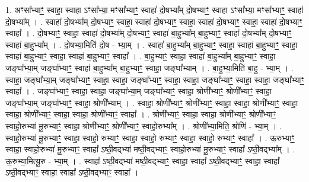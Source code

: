 \documentclass[17pt]{extarticle}
\begin{document}
1. अꣳसा᳚भ्याꣳ॒॒ स्वाहा॒ स्वाहा ऽꣳसा᳚भ्या॒ मꣳसा᳚भ्याꣳ॒॒ स्वाहा॑ दो॒षभ्या᳚म् दो॒षभ्याꣳ॒॒ स्वाहा ऽꣳसा᳚भ्या॒ मꣳसा᳚भ्याꣳ॒॒ स्वाहा॑ दो॒षभ्या᳚म् । . स्वाहा॑ दो॒षभ्या᳚म् दो॒षभ्याꣳ॒॒ स्वाहा॒ स्वाहा॑ दो॒षभ्याꣳ॒॒ स्वाहा॒ स्वाहा॑ दो॒षभ्याꣳ॒॒ स्वाहा॒ स्वाहा॑ दो॒षभ्याꣳ॒॒ स्वाहा᳚ । . दो॒षभ्याꣳ॒॒ स्वाहा॒ स्वाहा॑ दो॒षभ्या᳚म् दो॒षभ्याꣳ॒॒ स्वाहा॑ बा॒हुभ्या᳚म् बा॒हुभ्याꣳ॒॒ स्वाहा॑ दो॒षभ्या᳚म् दो॒षभ्याꣳ॒॒ स्वाहा॑ बा॒हुभ्या᳚म् । . दो॒षभ्या॒मिति॑ दो॒ष - भ्या॒म् । . स्वाहा॑ बा॒हुभ्या᳚म् बा॒हुभ्याꣳ॒॒ स्वाहा॒ स्वाहा॑ बा॒हुभ्याꣳ॒॒ स्वाहा॒ स्वाहा॑ बा॒हुभ्याꣳ॒॒ स्वाहा॒ स्वाहा॑ बा॒हुभ्याꣳ॒॒ स्वाहा᳚ । . बा॒हुभ्याꣳ॒॒ स्वाहा॒ स्वाहा॑ बा॒हुभ्या᳚म् बा॒हुभ्याꣳ॒॒ स्वाहा॒ जङ्घा᳚भ्या॒म् जङ्घा᳚भ्याꣳ॒॒ स्वाहा॑ बा॒हुभ्या᳚म् बा॒हुभ्याꣳ॒॒ स्वाहा॒ जङ्घा᳚भ्याम् । . बा॒हुभ्या॒मिति॑ बा॒हु - भ्या॒म् । . स्वाहा॒ जङ्घा᳚भ्या॒म् जङ्घा᳚भ्याꣳ॒॒ स्वाहा॒ स्वाहा॒ जङ्घा᳚भ्याꣳ॒॒ स्वाहा॒ स्वाहा॒ जङ्घा᳚भ्याꣳ॒॒ स्वाहा॒ स्वाहा॒ जङ्घा᳚भ्याꣳ॒॒ स्वाहा᳚ । . जङ्घा᳚भ्याꣳ॒॒ स्वाहा॒ स्वाहा॒ जङ्घा᳚भ्या॒म् जङ्घा᳚भ्याꣳ॒॒ स्वाहा॒ श्रोणी᳚भ्याꣳ॒॒ श्रोणी᳚भ्याꣳ॒॒ स्वाहा॒ जङ्घा᳚भ्या॒म् जङ्घा᳚भ्याꣳ॒॒ स्वाहा॒ श्रोणी᳚भ्याम् । . स्वाहा॒ श्रोणी᳚भ्याꣳ॒॒ श्रोणी᳚भ्याꣳ॒॒ स्वाहा॒ स्वाहा॒ श्रोणी᳚भ्याꣳ॒॒ स्वाहा॒ स्वाहा॒ श्रोणी᳚भ्याꣳ॒॒ स्वाहा॒ स्वाहा॒ श्रोणी᳚भ्याꣳ॒॒ स्वाहा᳚ । . श्रोणी᳚भ्याꣳ॒॒ स्वाहा॒ स्वाहा॒ श्रोणी᳚भ्याꣳ॒॒ श्रोणी᳚भ्याꣳ॒॒ स्वाहो॒रुभ्या॑ मू॒रुभ्याꣳ॒॒ स्वाहा॒ श्रोणी᳚भ्याꣳ॒॒ श्रोणी᳚भ्याꣳ॒॒ स्वाहो॒रुभ्या᳚म् । . श्रोणी᳚भ्या॒मिति॒ श्रोणि॑ - भ्या॒म् । . स्वाहो॒रुभ्या॑ मू॒रुभ्याꣳ॒॒ स्वाहा॒ स्वाहो॒ रुभ्याꣳ॒॒ स्वाहा॒ स्वाहो॒ रुभ्याꣳ॒॒ स्वाहा॒ स्वाहो॒ रुभ्याꣳ॒॒ स्वाहा᳚ । . ऊ॒रुभ्याꣳ॒॒ स्वाहा॒ स्वाहो॒रुभ्या॑ मू॒रुभ्याꣳ॒॒ स्वाहा᳚ ऽष्ठी॒वद्भ्या॑ मष्ठी॒वद्भ्याꣳ॒॒ स्वाहो॒रुभ्या॑ मू॒रुभ्याꣳ॒॒ स्वाहा᳚ ऽष्ठी॒वद्भ्या᳚म् । . ऊ॒रुभ्या॒मित्यू॒रु - भ्या॒म् । . स्वाहा᳚ ऽष्ठी॒वद्भ्या॑ मष्ठी॒वद्भ्याꣳ॒॒ स्वाहा॒ स्वाहा᳚ ऽष्ठी॒वद्भ्याꣳ॒॒ स्वाहा॒ स्वाहा᳚ ऽष्ठी॒वद्भ्याꣳ॒॒ स्वाहा॒ स्वाहा᳚ ऽष्ठी॒वद्भ्याꣳ॒॒ स्वाहा᳚ । \newline
\end{document}

